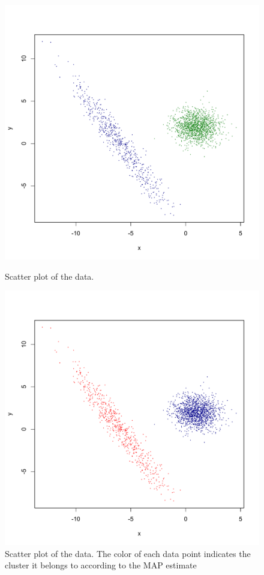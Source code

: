 \documentclass{article}
\begin{document}
\begin{figure}\begin{minipage}{0.4\columnwidth}\centering
	\includegraphics[scale=0.4]{scatterE31.pdf}
	\caption{Scatter plot of the data.}\label{fig:scatterE31}
\end{minipage}\hfil\begin{minipage}{0.4\columnwidth}\centering
	\includegraphics[scale=0.4]{scatterE313.pdf}
	\caption{Scatter plot of the data. The color of each data
point indicates the cluster it belongs to according to the MAP
estimate}\label{fig:scatterE313}
\end{minipage}\end{figure}
\end{document}

